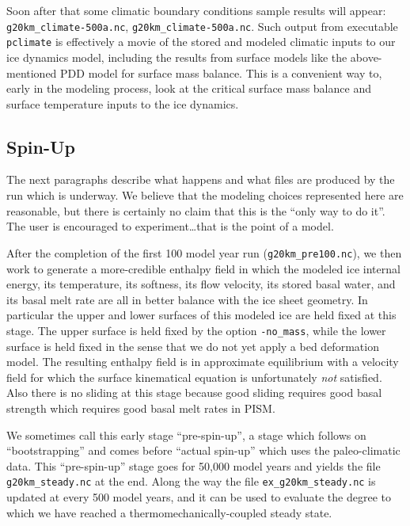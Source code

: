 Soon after that some climatic boundary conditions sample results will appear: \texttt{g20km_climate-500a.nc}, \texttt{g20km_climate-500a.nc}.  Such output from executable \texttt{pclimate} is effectively a movie of the stored and modeled climatic inputs to our ice dynamics model, including the results from surface models like the above-mentioned PDD model for surface mass balance.  This is a convenient way to, early in the modeling process, look at the critical surface mass balance and surface temperature inputs to the ice dynamics.

\subsection{Spin-Up}  \label{subsect:spinupsketch}  The next paragraphs describe what happens and what files are produced by the run which is underway.  We believe that the modeling choices represented here are reasonable, but there is certainly no claim that this is the ``only way to do it''.  The user is encouraged to experiment\dots that is the point of a model.

After the completion of the first 100 model year run (\texttt{g20km_pre100.nc}), we then work to generate a more-credible enthalpy field in which the modeled ice internal energy, its temperature, its softness, its flow velocity, its stored basal water, and its basal melt rate are all in better balance with the ice sheet geometry.  In particular the upper and lower surfaces of this modeled ice are held fixed at this stage.  The upper surface is held fixed by the option \texttt{-no_mass}, while the lower surface is held fixed in the sense that we do not yet apply a bed deformation model.  The resulting enthalpy field is in approximate equilibrium with a velocity field for which the surface kinematical equation \cite{Fowler} is unfortunately \emph{not} satisfied.  Also there is no sliding at this stage because good sliding requires good basal strength which requires good basal melt rates in PISM.

We sometimes call this early stage ``pre-spin-up'', a stage which follows on ``bootstrapping'' and comes before ``actual spin-up'' which uses the paleo-climatic data.  This ``pre-spin-up'' stage goes for 50,000 model years and yields the file \texttt{g20km_steady.nc} at the end.  Along the way the file \texttt{ex_g20km_steady.nc} is updated at every 500 model years, and it can be used to evaluate the degree to which we have reached a thermomechanically-coupled steady state.

